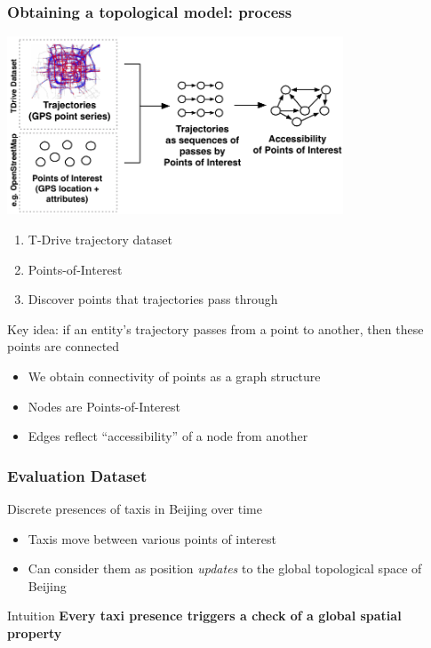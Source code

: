 \documentclass[pdf,10pt]{beamer}
\begin{document}
\begin{frame}[t]\frametitle{Obtaining a topological model: process}
\vspace{-0.35cm}
\begin{center}
\includegraphics[width=0.75\textwidth]{img/cl1.pdf}
\end{center}
\vspace{-0.44cm}
\begin{enumerate} 
 \item T-Drive trajectory dataset
 \item Points-of-Interest
 \item Discover points that trajectories pass through
 \end{enumerate}
\vspace{-0.24cm}

 \textcolor{mLightBrown}{Key idea:} if an entity's trajectory passes from a point to another, then these points are connected 
\vspace{-0.14cm}
 \begin{itemize} 
 \item We obtain connectivity of points as a graph structure
 \item Nodes are Points-of-Interest %
 \item Edges reflect ``accessibility'' of a node from another
 \end{itemize}
\end{frame}






\begin{frame}[t]\frametitle{Evaluation Dataset}
\vspace{2cm}
Discrete presences of taxis in Beijing over time
\begin{itemize} 
 \item Taxis move between various points of interest
 \item Can consider them as position \emph{updates} to the global topological space of Beijing
 \end{itemize}
\begin{exampleblock}{Intuition }
\textbf{Every taxi presence triggers a check of a global spatial property} %
\end{exampleblock}
\end{frame}
\end{document}
